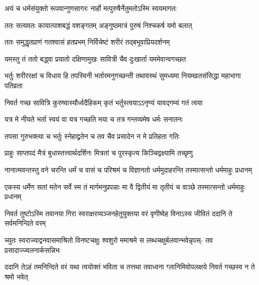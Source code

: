 \begin{center}
\twolineshloka
{अयं च धर्मसंयुक्तो रूपवान्गुणसागरः}
{नार्हो मत्पुरुषैर्नेतुमतोऽस्मि स्वयमागतः}


\twolineshloka
{ततः सत्यवतः कायात्पाशबद्धं वशङ्गतम्}
{अङ्गुष्ठमात्रं पुरुषं निश्चकर्ष यमो बलात्}


\twolineshloka
{ततः समुद्धृतप्राणं गतश्वासं हतप्रभम्}
{निर्विचेष्टं शरीरं तद्बभूवाप्रियदर्शनम्}


\twolineshloka
{यमस्तु तं ततो बद्ध्वा प्रयातो दक्षिणामुखः}
{सावित्री चैव दुःखार्ता यममेवान्वगच्छत}


\threelineshloka
{भर्तुः शरीररक्षां च विधाय हि तपस्विनी}
{भर्तारमनुगच्छन्ती  तथावस्थं सुमध्यमा}
{नियमव्रतसंसिद्धा महाभागा पतिव्रता}




\twolineshloka
{निवर्त गच्छ सावित्रि कुरुष्वास्यौर्ध्वदैहिकम्}
{कृतं भर्तुस्त्वयाऽऽनृण्यं यावद्गम्यं गतं त्वया}




\twolineshloka
{यत्र मे नीयते भर्ता स्वयं वा यत्र गच्छति}
{मया च तत्र गन्तव्यमेष धर्मः सनातनः}


\twolineshloka
{तपसा गुरुभक्त्या च भर्तुः स्नेहाद्व्रतेन च}
{तव चैव प्रसादेन न मे प्रतिहता गतिः}


\twolineshloka
{प्राहुः साप्तपदं मैत्रं बुधास्तत्त्वार्थदर्शिनः}
{मित्रतां च पुरस्कृत्य किञ्चिद्वक्ष्यामि तच्छृणु}


\fourlineindentedshloka
{नानात्मवन्तस्तु वने चरन्ति}
{धर्मं च वासं च परिश्रमं च}
{विज्ञानतो धर्ममुदाहरन्ति}
{तस्मात्सन्तो धर्ममाहुः प्रधानम्}


\fourlineindentedshloka
{एकस्य धर्मेण सतां मतेन}
{सर्वे स्म तं मार्गमनुप्रपन्नाः}
{मा वै द्वितीयं मा तृतीयं च वाञ्छे}
{तस्मात्सन्तो धर्ममाहुः प्रधानम्}




\fourlineindentedshloka
{निवर्त तुष्टोऽस्मि तवानया गिरा}
{स्वराक्षरव्यञ्जनहेतुयुक्तया}
{वरं वृणीष्वेह विनाऽस्य जीवितं}
{ददानि ते सर्वमनिन्दिते वरम्}




\fourlineindentedshloka
{च्युतः स्वराज्याद्वनवासमाश्रितो}
{विनष्टचक्षुः श्वशुरो ममाश्रमे}
{स लब्धचक्षुर्बलवान्भवेन्नृपस्-}
{तव प्रसादाज्ज्वलनार्कसन्निभः}




\fourlineindentedshloka
{ददानि तेऽहं तमनिन्दिते वरं}
{यथा त्वयोक्तं भविता च तत्तथा}
{तवाध्वना ग्लानिमिवोपलक्षये}
{निवर्त गच्छस्व न ते श्रमो भवेत्}


\end{center}
